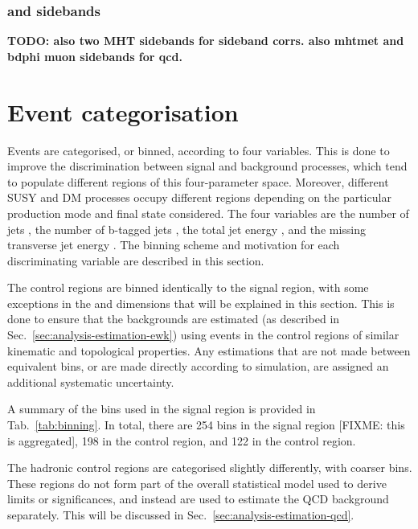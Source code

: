 \subsubsection{\mj and \mmj \mht sidebands}
\textbf{TODO: also two MHT sidebands for sideband corrs. also mhtmet and bdphi 
muon sidebands for qcd.}

\section{Event categorisation}
\label{sec:analysis-binning}

Events are categorised, or binned, according to four variables. This is done to 
improve the discrimination between signal and background processes, which tend 
to populate different regions of this four-parameter space. Moreover, different 
SUSY and DM processes occupy different regions depending on the particular 
production mode and final state considered. The four variables are the number 
of jets \njet, the number of b-tagged jets \nb, the total jet energy \scalht, 
and the missing transverse jet energy \mht. The binning scheme and motivation 
for each discriminating variable are described in this section.

The control regions are binned identically to the signal region, with some 
exceptions in the \mht and \nb dimensions that will be explained in this 
section. This is done to ensure that the backgrounds are 
estimated (as described in Sec.~\ref{sec:analysis-estimation-ewk}) using events 
in the control regions of similar kinematic and topological properties. Any 
estimations that are not made between equivalent bins, or are made directly 
according to simulation, are assigned an additional systematic uncertainty.

A summary of the bins used in the signal region is provided in 
Tab.~\ref{tab:binning}.
In total, there are 254 bins in the signal region [FIXME: this is aggregated], 
198 in the \mj control 
region, and 122 in the \mmj control region.

The hadronic control regions are categorised slightly differently, with coarser 
bins. These regions do not form part of the overall statistical model used to 
derive limits or significances, and instead are used to estimate the QCD 
background separately. This will be discussed in 
Sec.~\ref{sec:analysis-estimation-qcd}.

